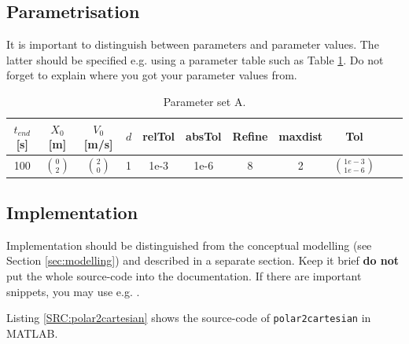 \documentclass[a4paper,11pt]{scrartcl}
\begin{document}
\subsection{Parametrisation}
It is important to distinguish between parameters and parameter values. The latter should be specified e.g. using a parameter table such as 
Table \ref{tab:ParA}. Do not forget to explain where you got your parameter values from.
\begin{table}[!h]
{\small%
\newcommand{\mc}[3]{\multicolumn{#1}{#2}{#3}}
\begin{center}
\begin{tabular}{|c|c|c|c|c|c|c|c|c|c|c|}
 \hline
 $t_{end}$ [s] & $X_0$ [m]    & $V_0$ [m/s]  & $d$ & relTol & absTol & Refine & maxdist & Tol\\
 \hline              
      100      & $\binom{0}{2}$ & $\binom{2}{0}$ &  1  & 1e-3   &  1e-6  &    8   &     2   &  $\binom{1e-3}{1e-6}$ \\
 \hline
\end{tabular}
\end{center}
}%
\caption{Parameter set A.}
\label{tab:ParA}
\end{table}

\subsection{Implementation}

Implementation should be distinguished from the conceptual modelling (see Section \ref{sec:modelling}) and described in a separate section. Keep it brief \textbf{do not} put the whole source-code into the documentation. If there are important snippets, you may use e.g. \verb||.

 

Listing \ref{SRC:polar2cartesian} shows the source-code of \verb|polar2cartesian| in MATLAB. 
 
\end{document}
